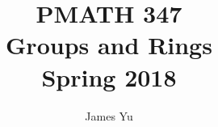 \documentclass[12pt]{book}
\theoremstyle{definition}
\begin{document}
\frontmatter

\title{PMATH 347\\Groups and Rings\\Spring 2018}
\author{James Yu}
\maketitle

\tableofcontents

\mainmatter



\printindex
\end{document}
